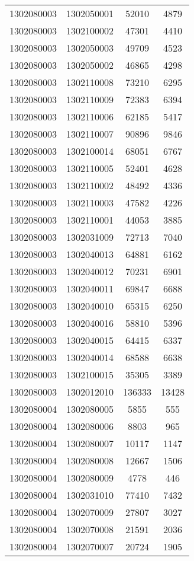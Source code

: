 \begin{longtable}[h]{llcc}
		1302080003 & 1302050001 & 52010 & 4879\\
		1302080003 & 1302100002 & 47301 & 4410\\
		1302080003 & 1302050003 & 49709 & 4523\\
		1302080003 & 1302050002 & 46865 & 4298\\
		1302080003 & 1302110008 & 73210 & 6295\\
		1302080003 & 1302110009 & 72383 & 6394\\
		1302080003 & 1302110006 & 62185 & 5417\\
		1302080003 & 1302110007 & 90896 & 9846\\
		1302080003 & 1302100014 & 68051 & 6767\\
		1302080003 & 1302110005 & 52401 & 4628\\
		1302080003 & 1302110002 & 48492 & 4336\\
		1302080003 & 1302110003 & 47582 & 4226\\
		1302080003 & 1302110001 & 44053 & 3885\\
		1302080003 & 1302031009 & 72713 & 7040\\
		1302080003 & 1302040013 & 64881 & 6162\\
		1302080003 & 1302040012 & 70231 & 6901\\
		1302080003 & 1302040011 & 69847 & 6688\\
		1302080003 & 1302040010 & 65315 & 6250\\
		1302080003 & 1302040016 & 58810 & 5396\\
		1302080003 & 1302040015 & 64415 & 6337\\
		1302080003 & 1302040014 & 68588 & 6638\\
		1302080003 & 1302100015 & 35305 & 3389\\
		1302080003 & 1302012010 & 136333 & 13428\\
		1302080004 & 1302080005 & 5855 & 555\\
		1302080004 & 1302080006 & 8803 & 965\\
		1302080004 & 1302080007 & 10117 & 1147\\
		1302080004 & 1302080008 & 12667 & 1506\\
		1302080004 & 1302080009 & 4778 & 446\\
		1302080004 & 1302031010 & 77410 & 7432\\
		1302080004 & 1302070009 & 27807 & 3027\\
		1302080004 & 1302070008 & 21591 & 2036\\
		1302080004 & 1302070007 & 20724 & 1905\\

\end{longtable}
